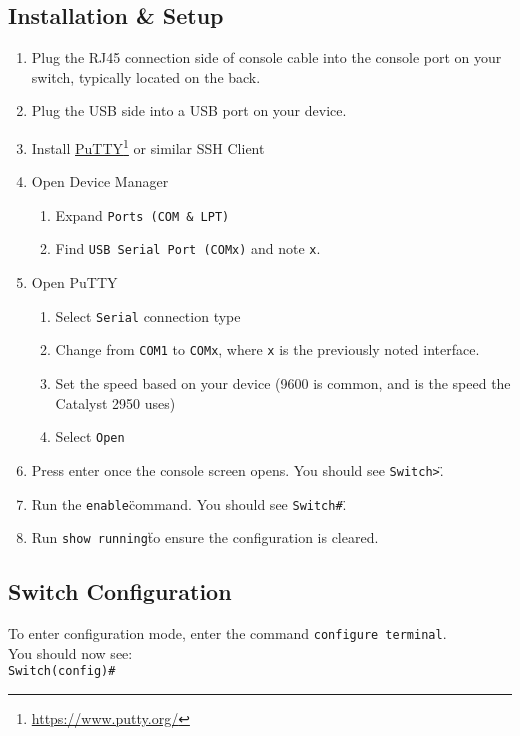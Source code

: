 \documentclass{ol-softwaremanual}
\newcommand{\doclink}[2]{\href{#1}{#2}\footnote{\url{#1}}}
\begin{document}
        \subsection{Installation \& Setup}\label{subsec:installation}
        \begin{enumerate}
            \item Plug the RJ45 connection side of console cable into the console port on your switch, typically located on the back.
            \item Plug the USB side into a USB port on your device.
            \item Install \doclink{https://www.putty.org/}{PuTTY} or similar SSH Client
            \item Open Device Manager
                \begin{enumerate}
                    \item Expand \verb|Ports (COM & LPT)|
                    \item Find \verb|USB Serial Port (COMx)| and note \verb|x|.
                \end{enumerate}
            \item Open PuTTY
                \begin{enumerate}
                    \item Select \verb|Serial| connection type
                    \item Change from \verb|COM1| to \verb|COMx|, where \verb|x| is the previously noted interface.
                    \item Set the speed based on your device (9600 is common, and is the speed the Catalyst 2950 uses)
                    \item Select \verb|Open|
                \end{enumerate}
            \item Press enter once the console screen opens.
            You should see \"\verb|Switch>|\".
            \item Run the \"\verb|enable|\" command.
            You should see \"\verb|Switch#|\".
            \item Run \"\verb|show running|\" to ensure the configuration is cleared.
        \end{enumerate}
        \subsection{Switch Configuration}\label{subsec:config}
        To enter configuration mode, enter the command \verb|configure terminal|.\\
        You should now see:\\
        \verb|Switch(config)#|
\end{document}
